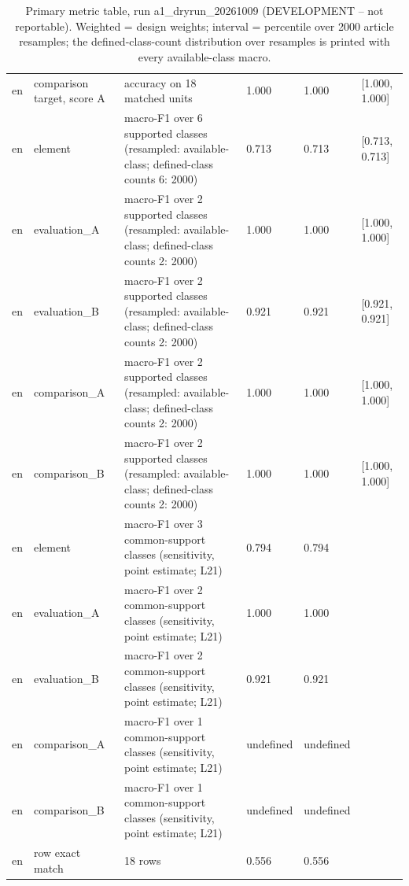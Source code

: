 \begin{table}[htbp]
\begin{tabular}{llllll}
en & comparison target, score A & accuracy on 18 matched units & 1.000 & 1.000 & [1.000, 1.000] \\
en & element & macro-F1 over 6 supported classes (resampled: available-class; defined-class counts {6: 2000}) & 0.713 & 0.713 & [0.713, 0.713] \\
en & evaluation\_A & macro-F1 over 2 supported classes (resampled: available-class; defined-class counts {2: 2000}) & 1.000 & 1.000 & [1.000, 1.000] \\
en & evaluation\_B & macro-F1 over 2 supported classes (resampled: available-class; defined-class counts {2: 2000}) & 0.921 & 0.921 & [0.921, 0.921] \\
en & comparison\_A & macro-F1 over 2 supported classes (resampled: available-class; defined-class counts {2: 2000}) & 1.000 & 1.000 & [1.000, 1.000] \\
en & comparison\_B & macro-F1 over 2 supported classes (resampled: available-class; defined-class counts {2: 2000}) & 1.000 & 1.000 & [1.000, 1.000] \\
en & element & macro-F1 over 3 common-support classes (sensitivity, point estimate; L21) & 0.794 & 0.794 &  \\
en & evaluation\_A & macro-F1 over 2 common-support classes (sensitivity, point estimate; L21) & 1.000 & 1.000 &  \\
en & evaluation\_B & macro-F1 over 2 common-support classes (sensitivity, point estimate; L21) & 0.921 & 0.921 &  \\
en & comparison\_A & macro-F1 over 1 common-support classes (sensitivity, point estimate; L21) & undefined & undefined &  \\
en & comparison\_B & macro-F1 over 1 common-support classes (sensitivity, point estimate; L21) & undefined & undefined &  \\
en & row exact match & 18 rows & 0.556 & 0.556 &  \\
\bottomrule
\end{tabular}
\caption{Primary metric table, run a1\_dryrun\_20261009 (DEVELOPMENT -- not reportable). Weighted = design weights; interval = percentile over 2000 article resamples; the defined-class-count distribution over resamples is printed with every available-class macro.}
\end{table}
